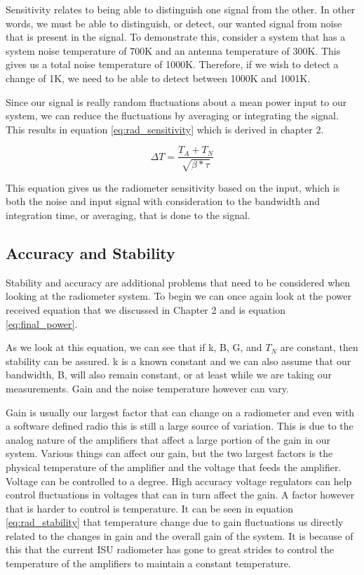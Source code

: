 Sensitivity relates to being able to distinguish one signal from the other.  In other words, we must be able to distinguish, or detect, our wanted signal from noise that is present in the signal.  To demonstrate this, consider a system that has a system noise temperature of 700K and an antenna temperature of 300K.  This gives us a total noise temperature of 1000K.  Therefore, if we wish to detect a change of 1K, we need to be able to detect between 1000K and 1001K.

Since our signal is really random fluctuations about a mean power input to our system, we can reduce the fluctuations by averaging or integrating the signal.  This results in equation \ref{eq:rad_sensitivity} which is derived in chapter 2.

\begin{equation} \label{eq:rad_sensitivity}
\Delta T=\frac{T_{A}+T_{N}}{\sqrt{\beta * \tau}}
\end{equation}


This equation gives us the radiometer sensitivity based on the input, which is both the noise and input signal with consideration to the bandwidth and integration time, or averaging, that is done to the signal.  

\subsection{Accuracy and Stability}
Stability and accuracy are additional problems that need to be considered when looking at the radiometer system.  To begin we can once again look at the power received equation that we discussed in Chapter 2 and is equation \ref{eq:final_power}.

As we look at this equation, we can see that if k, B, G, and $T_{N}$ are constant, then stability can be assured.  k is a known constant and we can also assume that our bandwidth, B, will also remain constant, or at least while we are taking our measurements.  Gain and the noise temperature however can vary.  

Gain is usually our largest factor that can change on a radiometer and even with a software defined radio this is still a large source of variation.  This is due to the analog nature of the amplifiers that affect a large portion of the gain in our system.  Various things can affect our gain, but the two largest factors is the physical temperature of the amplifier and the voltage that feeds the amplifier.  Voltage can be controlled to a degree.  High accuracy voltage regulators can help control fluctuations in voltages that can in turn affect the gain.  A factor however that is harder to control is temperature.  It can be seen in equation \ref{eq:rad_stability} that temperature change due to gain fluctuations us directly related to the changes in gain and the overall gain of the system. It is because of this that the current ISU radiometer has gone to great strides to control the temperature of the amplifiers to maintain a constant temperature.

